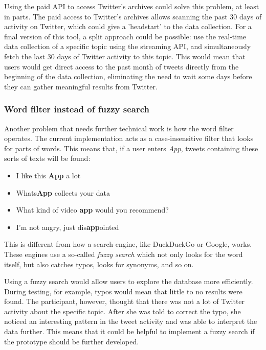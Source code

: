 Using the paid API to access Twitter's archives could solve this problem, at least in parts. The paid access to Twitter's archives allows scanning the past 30 days of activity on Twitter, which could give a 'headstart' to the data collection. For a final version of this tool, a split approach could be possible: use the real-time data collection of a specific topic using the streaming API, and simultaneously fetch the last 30 days of Twitter activity to this topic. This would mean that users would get direct access to the past month of tweets directly from the beginning of the data collection, eliminating the need to wait some days before they can gather meaningful results from Twitter.

\subsubsection*{Word filter instead of fuzzy search}
Another problem that needs further technical work is how the word filter operates. The current implementation acts as a case-insensitive filter that looks for parts of words. This means that, if a user enters \emph{App}, tweets containing these sorts of texts will be found:

\begin{itemize}
    \item I like this \textbf{App} a lot
    \item Whats\textbf{App} collects your data
    \item What kind of video \textbf{app} would you recommend?
    \item I'm not angry, just dis\textbf{app}ointed
\end{itemize}

This is different from how a search engine, like DuckDuckGo or Google, works. These engines use a so-called \emph{fuzzy search} which not only looks for the word itself, but also catches typos, looks for synonyms, and so on.

Using a fuzzy search would allow users to explore the database more efficiently. During testing, for example, typos would mean that little to no results were found. The participant, however, thought that there was not a lot of Twitter activity about the specific topic. After she was told to correct the typo, she noticed an interesting pattern in the tweet activity and was able to interpret the data further. This means that it could be helpful to implement a fuzzy search if the prototype should be further developed.

